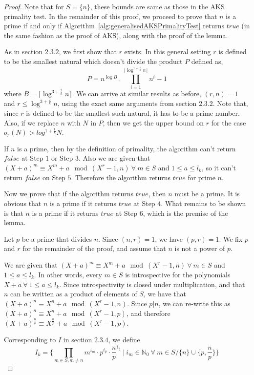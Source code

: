 \documentclass[11pt]{report}
\begin{document}
\begin{proof}
Note that for $S = \{n\}$, these bounds are same as those in the AKS primality test. In the remainder of this proof, we proceed to prove that $n$ is a prime if and only if Algorithm~\ref{alg:generalisedAKSPrimalityTest} returns $true$ (in the same fashion as the proof of AKS), along with the proof of the lemma.

As in section $2.3.2$, we first show that $r$ exists. In this general setting $r$ is defined to be the smallest natural which doesn't divide the product $P$ defined as,
\[P = n^{\log B}\ .\ \prod_{i=1}^{\lfloor \log^{1 + \frac{1}{k}} n \rfloor}{n^i-1} \]
where $B = \lceil \log^{3 + \frac{2}{k}} n \rceil$. We can arrive at similar results as before, $(r, n) = 1$ and $r \leq \log^{3 + \frac 2 {k}} n$, using the exact same arguments from section $2.3.2$. Note that, since $r$ is defined to be the smallest such natural, it has to be a prime number. Also, if we replace $n$ with $N$ in $P$, then we get the upper bound on $r$ for the case $o_r(N) > log^{1 + \frac{1}{k}} N$.

If $n$ is a prime, then by the definition of primality, the algorithm can't return $false$ at Step $1$ or Step $3$. Also we are given that $(X+a)^m \equiv X^m + a \mod (X^r-1, n)\ \forall \ m \in S$ and $1 \leq a \leq l_k$, so it can't return $false$ on Step $5$. Therefore the algorithm returns $true$ for prime $n$.

Now we prove that if the algorithm returns $true$, then $n$ must be a prime. It is obvious that $n$ is a prime if it returns $true$ at Step $4$. What remains to be shown is that $n$ is a prime if it returns $true$ at Step $6$, which is the premise of the lemma.

Let $p$ be a prime that divides $n$. Since $(n,r) = 1$, we have $(p,r) = 1$. We fix $p$ and $r$ for the remainder of the proof, and assume that $n$ is not a power of $p$.

We are given that $(X+a)^m \equiv X^m + a \mod (X^r-1, n)\ \forall \ m \in S$ and $1 \leq a \leq l_k$. In other words, every $m \in S$ is introspective for the polynomials $X+a\ \forall \ 1 \leq a \leq l_k$. Since introspectivity is closed under multiplication, and that $n$ can be written as a product of elements of $S$, we have that $(X+a)^n \equiv X^n + a \mod (X^r-1, n)$. Since $p | n$, we can re-write this as $(X+a)^n \equiv X^n + a \mod (X^r-1, p)$, and therefore $(X+a)^\frac{n}{p} \equiv X^\frac{n}{p} + a \mod (X^r-1, p)$.

Corresponding to $I$ in section $2.3.4$, we define
\[I_k = \{ \prod_{m \in S, m \neq n} m^{i_m} \cdot p^{i_p} \cdot \frac{n}{p}^{i_\frac{n}{p}}\ |\ i_m \in \mathbb{N}_0\ \forall\ m \in S / \{n\} \cup \{p, \frac{n}{p}\} \}\]


\end{proof}
\end{document}
